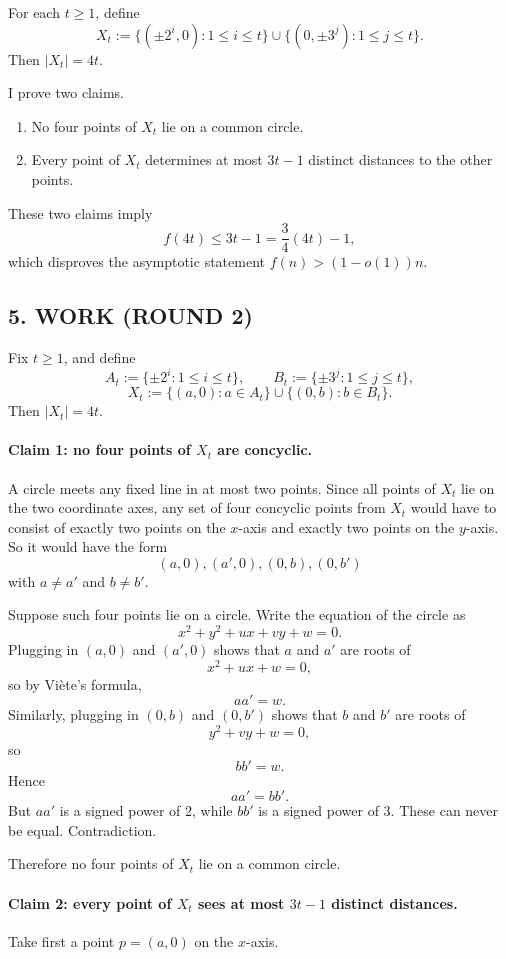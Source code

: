 For each $t\ge 1$, define
\[
X_t:=\{(\pm 2^i,0):1\le i\le t\}\cup\{(0,\pm 3^j):1\le j\le t\}.
\]
Then $|X_t|=4t$.

I prove two claims.

\begin{enumerate}
\item No four points of $X_t$ lie on a common circle.
\item Every point of $X_t$ determines at most $3t-1$ distinct distances to the other points.
\end{enumerate}

These two claims imply
\[
f(4t)\le 3t-1=\frac{3}{4}(4t)-1,
\]
which disproves the asymptotic statement $f(n)>(1-o(1))n$.

\subsection*{5. WORK (ROUND 2)}

Fix $t\ge 1$, and define
\[
A_t:=\{\pm 2^i:1\le i\le t\},\qquad B_t:=\{\pm 3^j:1\le j\le t\},
\]
\[
X_t:=\{(a,0):a\in A_t\}\cup \{(0,b):b\in B_t\}.
\]
Then $|X_t|=4t$.

\paragraph{Claim 1: no four points of $X_t$ are concyclic.}
A circle meets any fixed line in at most two points.  Since all points of $X_t$ lie on the two coordinate axes, any set of four concyclic points from $X_t$ would have to consist of exactly two points on the $x$-axis and exactly two points on the $y$-axis.  So it would have the form
\[
(a,0),(a',0),(0,b),(0,b')
\]
with $a\ne a'$ and $b\ne b'$.

Suppose such four points lie on a circle.  Write the equation of the circle as
\[
x^2+y^2+ux+vy+w=0.
\]
Plugging in $(a,0)$ and $(a',0)$ shows that $a$ and $a'$ are roots of
\[
x^2+ux+w=0,
\]
so by Vi\`ete's formula,
\[
aa'=w.
\]
Similarly, plugging in $(0,b)$ and $(0,b')$ shows that $b$ and $b'$ are roots of
\[
y^2+vy+w=0,
\]
so
\[
bb'=w.
\]
Hence
\[
aa'=bb'.
\]
But $aa'$ is a signed power of $2$, while $bb'$ is a signed power of $3$.  These can never be equal.  Contradiction.

Therefore no four points of $X_t$ lie on a common circle.

\paragraph{Claim 2: every point of $X_t$ sees at most $3t-1$ distinct distances.}
Take first a point $p=(a,0)$ on the $x$-axis.

